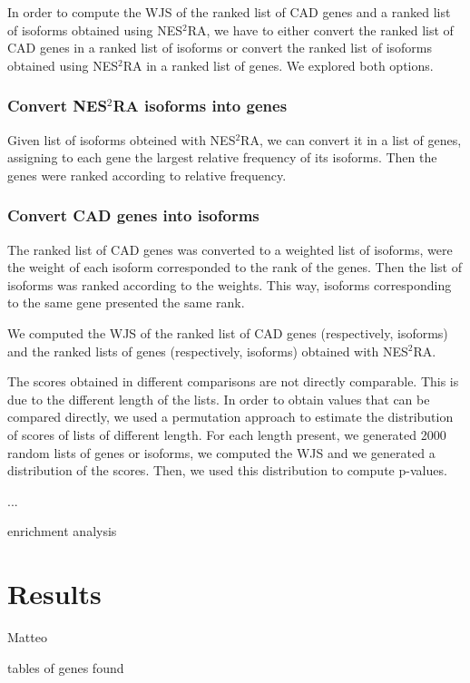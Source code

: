 \documentclass[fleqn,10pt]{SelfArx} %
\begin{document}
In order to compute the WJS of the ranked list of CAD genes and a ranked list of isoforms obtained using NES$^2$RA, we have to either convert the ranked list of CAD genes in a ranked list of isoforms or convert the ranked  list of isoforms obtained using NES$^2$RA in a ranked list of genes. We explored both options.

\subsubsection{Convert NES$^2$RA isoforms into genes}

Given list of isoforms obteined with NES$^2$RA, we can convert it in a list of genes, assigning to each gene the largest relative frequency of its isoforms. Then the genes were ranked according to relative frequency.

\subsubsection{Convert CAD genes into isoforms}

The ranked list of CAD genes was converted to a weighted list of isoforms, were the weight of each isoform corresponded to the rank of the genes. Then the list of isoforms was ranked according to the weights. This way, isoforms corresponding to the same gene presented the same rank.

We computed the WJS of the ranked list of CAD genes (respectively, isoforms) and the ranked lists of genes (respectively, isoforms) obtained with NES$^2$RA. 

The scores obtained in different comparisons are not directly comparable. This is due to the different length of the lists. In order to obtain values that can be compared directly, we used a permutation approach to estimate the distribution of scores of lists of different length. For each length present, we generated 2000 random lists of genes or isoforms, we computed the WJS and we generated a distribution of the scores. Then, we used this distribution to compute p-values.

...

enrichment analysis

\section*{Results}

Matteo

tables of genes found
\end{document}
